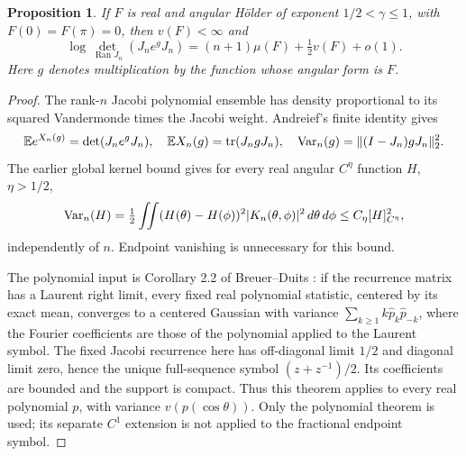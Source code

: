 \documentclass[11pt,letterpaper]{article}
\newtheorem{proposition}[theorem]{Proposition}
\theoremstyle{remark}\newtheorem{remark}[theorem]{Remark}
\DeclareMathOperator{\tr}{tr}\DeclareMathOperator{\Ran}{Ran}
\begin{document}
\begin{proposition}\label{dsasm:prop:scalarconstant}
If $F$ is real and angular H\"older of exponent
$1/2<\gamma\le1$, with $F(0)=F(\pi)=0$, then $v(F)<\infty$ and
\begin{equation}\label{dsasm:scalarconstant}
 \log\det_{\Ran J_n}(J_ne^gJ_n)
     =(n+1)\mu(F)+\tfrac12v(F)+o(1).
\end{equation}
Here $g$ denotes multiplication by the function whose angular form is $F$.
\end{proposition}
\begin{proof}
The rank-$n$ Jacobi polynomial ensemble has density proportional to
its squared Vandermonde times the Jacobi weight. Andreief's finite
identity gives
\[
 \mathbb E e^{X_n(g)}=\det(J_ne^gJ_n),\quad
 \mathbb E X_n(g)=\tr(J_ngJ_n),\quad
 \Var_n(g)=\|(I-J_n)gJ_n\|_2^2.
\]
The earlier global kernel bound gives for every real angular
$C^\eta$ function $H$, $\eta>1/2$,
\begin{equation}\label{dsasm:varianceholder}
 \operatorname{Var}_n(H)=\tfrac12\iint(H(\theta)-H(\phi))^2
                      |K_n(\theta,\phi)|^2\,d\theta\,d\phi
 \le C_\eta[H]_{C^\eta}^2,
\end{equation}
independently of $n$. Endpoint vanishing is unnecessary for this bound.

The polynomial input is Corollary 2.2 of Breuer--Duits
\cite{bd}: if the recurrence matrix has a Laurent right limit,
every fixed real polynomial statistic, centered by its exact mean,
converges to a centered Gaussian with variance
$\sum_{k\ge1}k\widehat p_k\widehat p_{-k}$, where the Fourier
coefficients are those of the polynomial applied to the Laurent symbol.
The fixed Jacobi recurrence here has off-diagonal limit $1/2$ and
diagonal limit zero, hence the unique full-sequence symbol
$(z+z^{-1})/2$. Its coefficients are bounded and the support is compact.
Thus this theorem applies to every real polynomial $p$, with variance
$v(p(\cos\theta))$. Only the polynomial theorem is used; its separate
$C^1$ extension is not applied to the fractional endpoint symbol.


\end{proof}
\end{document}
